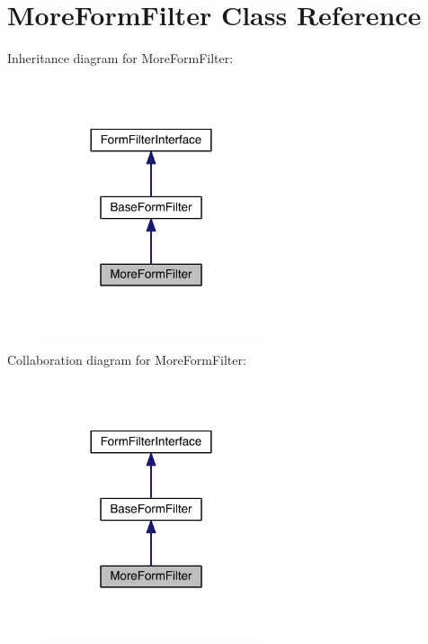 \hypertarget{classapp_1_1models_1_1core_1_1_form_1_1_more_form_filter}{\section{More\-Form\-Filter Class Reference}
\label{classapp_1_1models_1_1core_1_1_form_1_1_more_form_filter}
}


Inheritance diagram for More\-Form\-Filter\-:
\nopagebreak
\begin{figure}[H]
\begin{center}
\leavevmode
\includegraphics[width=180pt]{classapp_1_1models_1_1core_1_1_form_1_1_more_form_filter__inherit__graph}
\end{center}
\end{figure}


Collaboration diagram for More\-Form\-Filter\-:
\nopagebreak
\begin{figure}[H]
\begin{center}
\leavevmode
\includegraphics[width=180pt]{classapp_1_1models_1_1core_1_1_form_1_1_more_form_filter__coll__graph}
\end{center}
\end{figure}
